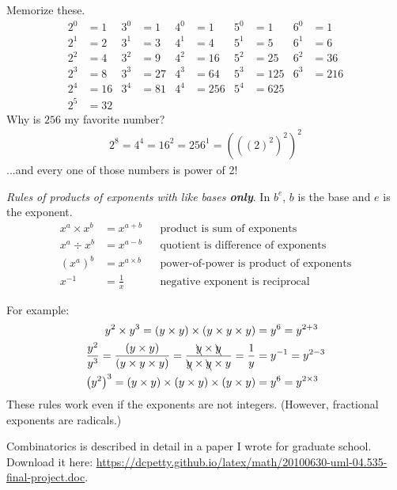 \documentclass[11pt]{article}%
\begin{document}
\begin{multicols*}{2}
\divider

Memorize these.
\begin{align*}
2^{0} &= 1 & 3^{0} &= 1 & 4^{0} &= 1 & 5^{0} &= 1 & 6^{0} &= 1 \\
2^{1} &= 2 & 3^{1} &= 3 & 4^{1} &= 4 & 5^{1} &= 5 & 6^{1} &= 6 \\
2^{2} &= 4 & 3^{2} &= 9 & 4^{2} &= 16 & 5^{2} &= 25 & 6^{2} &= 36 \\
2^{3} &= 8 & 3^{3} &= 27 & 4^{3} &= 64 & 5^{3} &= 125 & 6^{3} &= 216 \\
2^{4} &= 16 & 3^{4} &= 81 & 4^{4} &= 256 & 5^{4} &= 625 \\
2^{5} &= 32
\end{align*}
Why is $256$ my favorite number?
\begin{align*}
2^{8} = 4^{4} = 16^{2} = 256^{1} = \left(\left(\left( 2 \right)^{2}\right)^{2}\right)^{2}
\end{align*}
...and every one of those numbers is power of 2!

\divider

\textit{Rules of products of exponents with like bases \textbf{only}}. In $b^{e}$, $b$ is the base and $e$ is the exponent.
\begin{align*}
x^{a} \times x^{b} &= x^{a + b} && \text{product is sum of exponents} \\
x^{a} \div x^{b} &= x^{a - b} && \text{quotient is difference of exponents} \\
\left( x^{a}\right)^{b} &= x^{a \times b} && \text{power-of-power is product of exponents} \\
x^{-1} &= \frac{1}{x} && \text{negative exponent is reciprocal}
\end{align*}

For example:
\begin{align*}
y^{2} \times y^{3} = \left( y \times y \right) \times \left( y \times y \times y \right) &= y^{6} = y^{2 + 3} \\
\frac{y^{2}}{y^{3}} = \frac{\left( y \times y \right)}{\left( y \times y \times y \right)} = \frac{\bcancel{y} \times \bcancel{y}}{\bcancel{y} \times \bcancel{y} \times y} = \frac{1}{y} &= y^{-1} = y^{2 - 3} \\
\left( y^{2} \right)^{3} = \left( y \times y \right) \times \left( y \times y \right) \times \left( y \times y \right) &= y^{6} = y^{2 \times 3}
\end{align*}
These rules work even if the exponents are not integers. (However, fractional exponents are radicals.)

\divider


\divider


Combinatorics is described in detail in a paper I wrote for graduate school. Download it here: \url{https://dcpetty.github.io/latex/math/20100630-uml-04.535-final-project.doc}.

\divider

\end{multicols*}
\end{document}
